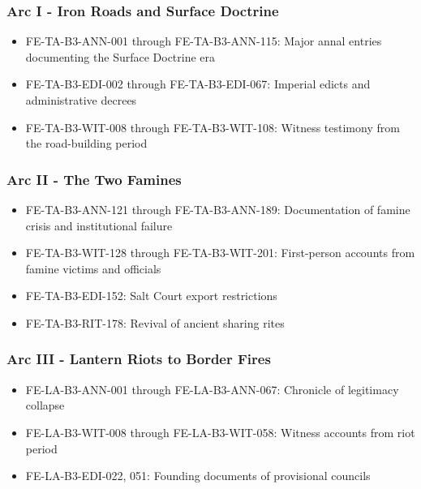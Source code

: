 \subsubsection{Arc I - Iron Roads and Surface
Doctrine}\label{arc-i---iron-roads-and-surface-doctrine}

\begin{itemize}
\tightlist
\item
  FE-TA-B3-ANN-001 through FE-TA-B3-ANN-115: Major annal entries
  documenting the Surface Doctrine era
\item
  FE-TA-B3-EDI-002 through FE-TA-B3-EDI-067: Imperial edicts and
  administrative decrees
\item
  FE-TA-B3-WIT-008 through FE-TA-B3-WIT-108: Witness testimony from the
  road-building period
\end{itemize}

\subsubsection{Arc II - The Two Famines}\label{arc-ii---the-two-famines}

\begin{itemize}
\tightlist
\item
  FE-TA-B3-ANN-121 through FE-TA-B3-ANN-189: Documentation of famine
  crisis and institutional failure
\item
  FE-TA-B3-WIT-128 through FE-TA-B3-WIT-201: First-person accounts from
  famine victims and officials
\item
  FE-TA-B3-EDI-152: Salt Court export restrictions
\item
  FE-TA-B3-RIT-178: Revival of ancient sharing rites
\end{itemize}

\subsubsection{Arc III - Lantern Riots to Border
Fires}\label{arc-iii---lantern-riots-to-border-fires}

\begin{itemize}
\tightlist
\item
  FE-LA-B3-ANN-001 through FE-LA-B3-ANN-067: Chronicle of legitimacy
  collapse
\item
  FE-LA-B3-WIT-008 through FE-LA-B3-WIT-058: Witness accounts from riot
  period
\item
  FE-LA-B3-EDI-022, 051: Founding documents of provisional councils
\end{itemize}

